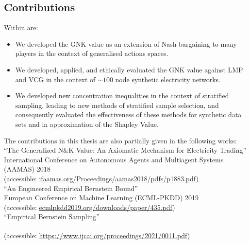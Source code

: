 \subsection{Contributions}

Within \DIFdelbegin {}\DIFdelend \DIFaddbegin {}\DIFaddend are:
\begin{itemize}
\item We developed the GNK value as an extension of Nash bargaining to many players in the context of generalised actions spaces.
\item We developed, applied, and ethically evaluated the GNK value against LMP and VCG in the context of $\sim 100$ node synthetic electricity networks.
\item We developed new concentration inequalities in the context of stratified sampling, leading to new methods of stratified sample selection, and consequently evaluated the effectiveness of these methods for synthetic data sets and in approximation of the Shapley Value.
\end{itemize}

\noindent The contributions in this thesis are also partially given in the following works:\\

\noindent``The Generalized N\&K Value: An Axiomatic Mechanism for Electricity Trading'' \DIFaddbegin {}\DIFaddend \\ International Conference on Autonomous Agents and Multiagent Systems\\ (AAMAS) 2018\\
(accessible: \href{ifaamas.org/Proceedings/aamas2018/pdfs/p1883.pdf}{ifaamas.org/Proceedings/aamas2018/pdfs/p1883.pdf})\\


\noindent``An Engineered Empirical Bernstein Bound'' \DIFdelbegin \DIFdel{,}\DIFdelend \DIFaddbegin {}\DIFaddend \\ European Conference on Machine Learning (ECML-PKDD) 2019\\
(accessible: \href{http://ecmlpkdd2019.org/downloads/paper/435.pdf}{ecmlpkdd2019.org/downloads/paper/435.pdf})\\


\noindent``\DIFdelbegin {}\DIFdelend \DIFaddbegin {}\DIFaddend Empirical Bernstein Sampling'' \DIFdelbegin {}\DIFdelend \DIFaddbegin {}\\ \DIFaddend \\
(accessible: \DIFdelbegin %
\DIFdelend \DIFaddbegin \href{https://www.ijcai.org/proceedings/2021/0011.pdf}{https://www.ijcai.org/proceedings/2021/0011.pdf}\DIFaddend )


